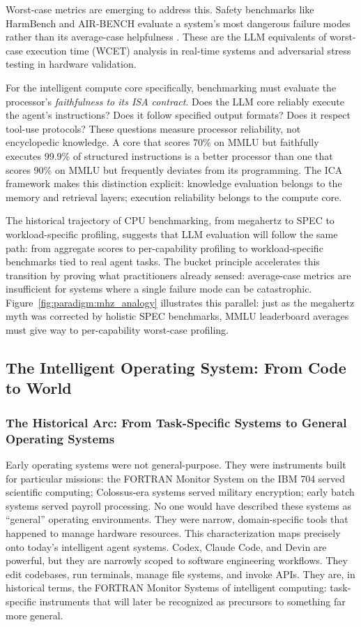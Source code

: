 Worst-case metrics are emerging to address this. Safety benchmarks like HarmBench and AIR-BENCH evaluate a system's most dangerous failure modes rather than its average-case helpfulness \cite{harmbench_2024, airbench_2024}. These are the LLM equivalents of worst-case execution time (WCET) analysis in real-time systems and adversarial stress testing in hardware validation.

For the intelligent compute core specifically, benchmarking must evaluate the processor's \textit{faithfulness to its ISA contract}. Does the LLM core reliably execute the agent's instructions? Does it follow specified output formats? Does it respect tool-use protocols? These questions measure processor reliability, not encyclopedic knowledge. A core that scores 70\% on MMLU but faithfully executes 99.9\% of structured instructions is a better processor than one that scores 90\% on MMLU but frequently deviates from its programming. The ICA framework makes this distinction explicit: knowledge evaluation belongs to the memory and retrieval layers; execution reliability belongs to the compute core.

The historical trajectory of CPU benchmarking, from megahertz to SPEC to workload-specific profiling, suggests that LLM evaluation will follow the same path: from aggregate scores to per-capability profiling to workload-specific benchmarks tied to real agent tasks. The bucket principle accelerates this transition by proving what practitioners already sensed: average-case metrics are insufficient for systems where a single failure mode can be catastrophic.
Figure~\ref{fig:paradigm:mhz_analogy} illustrates this parallel: just as the megahertz myth was corrected by holistic SPEC benchmarks, MMLU leaderboard averages must give way to per-capability worst-case profiling.


\subsection{The Intelligent Operating System: From Code to World}

\subsubsection{The Historical Arc: From Task-Specific Systems to General Operating Systems}

Early operating systems were not general-purpose. They were instruments built for particular missions: the FORTRAN Monitor System on the IBM 704 served scientific computing; Colossus-era systems served military encryption; early batch systems served payroll processing. No one would have described these systems as ``general'' operating environments. They were narrow, domain-specific tools that happened to manage hardware resources. This characterization maps precisely onto today's intelligent agent systems. Codex, Claude Code, and Devin are powerful, but they are narrowly scoped to software engineering workflows. They edit codebases, run terminals, manage file systems, and invoke APIs. They are, in historical terms, the FORTRAN Monitor Systems of intelligent computing: task-specific instruments that will later be recognized as precursors to something far more general.

